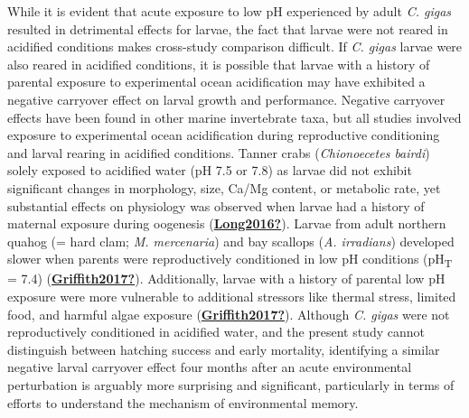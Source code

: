 \documentclass [11pt, proquest] {uwthesis}[2015/03/03]
\begin{document}
While it is evident that acute exposure to low pH experienced by adult \emph{C. gigas} resulted in detrimental effects for larvae, the fact that larvae were not reared in acidified conditions makes cross-study comparison difficult. If \emph{C. gigas} larvae were also reared in acidified conditions, it is possible that larvae with a history of parental exposure to experimental ocean acidification may have exhibited a negative carryover effect on larval growth and performance. Negative carryover effects have been found in other marine invertebrate taxa, but all studies involved exposure to experimental ocean acidification during reproductive conditioning and larval rearing in acidified conditions. Tanner crabs (\emph{Chionoecetes bairdi}) solely exposed to acidified water (pH 7.5 or 7.8) as larvae did not exhibit significant changes in morphology, size, Ca/Mg content, or metabolic rate, yet substantial effects on physiology was observed when larvae had a history of maternal exposure during oogenesis (\protect\hyperlink{ref-Long2016}{\textbf{Long2016?}}). Larvae from adult northern quahog (= hard clam; \emph{M. mercenaria}) and bay scallops (\emph{A. irradians}) developed slower when parents were reproductively conditioned in low pH conditions (pH\textsubscript{T} = 7.4) (\protect\hyperlink{ref-Griffith2017}{\textbf{Griffith2017?}}). Additionally, larvae with a history of parental low pH exposure were more vulnerable to additional stressors like thermal stress, limited food, and harmful algae exposure (\protect\hyperlink{ref-Griffith2017}{\textbf{Griffith2017?}}). Although \emph{C. gigas} were not reproductively conditioned in acidified water, and the present study cannot distinguish between hatching success and early mortality, identifying a similar negative larval carryover effect four months after an acute environmental perturbation is arguably more surprising and significant, particularly in terms of efforts to understand the mechanism of environmental memory.
\end{document}
